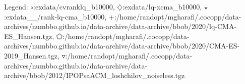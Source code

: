 Legend: {\color{CornflowerBlue}$\circ$}:exdata/cvranklq\_b10000, {\color{Orange}$\diamondsuit$}:exdata/lq-xcma\_b10000, {\color{Green}$\star$}:exdata\_\_/rank-lq-cma\_b10000, {\color{red}+}:/home/randopt/mgharafi/.cocopp/data-archives/numbbo.github.io/data-archive/data-archive/bbob/2020/lq-CMA-ES\_Hansen.tgz, {\color{magenta}$\pentagon$}:/home/randopt/mgharafi/.cocopp/data-archives/numbbo.github.io/data-archive/data-archive/bbob/2020/CMA-ES-2019\_Hansen.tgz, {\color{brown}$\triangledown$}:/home/randopt/mgharafi/.cocopp/data-archives/numbbo.github.io/data-archive/data-archive/bbob/2012/IPOPsaACM\_loshchilov\_noiseless.tgz